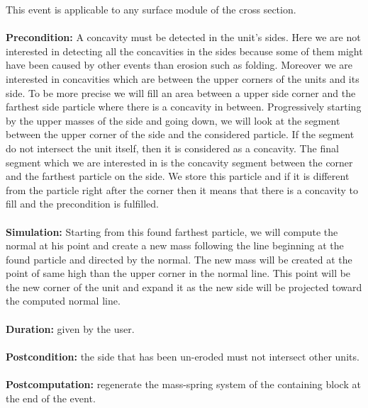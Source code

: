 \documentclass[12pt, a4paper]{report} %
\begin{document}
This event is applicable to any surface module of the cross section.\\\\
\textbf{Precondition:} A concavity must be detected in the unit's sides. Here we are not interested in detecting all the concavities in the sides because some of them might have been caused by other events than erosion such as folding. Moreover we are interested in concavities which are between the upper corners of the units and its side. To be more precise we will fill an area between a upper side corner and the farthest side particle where there is a concavity in between. Progressively starting by the upper masses of the side and going down, we will look at the segment between the upper corner of the side and the considered particle. If the segment do not intersect the unit itself, then it is considered as a concavity. The final segment which we are interested in is the concavity segment between the corner and the farthest particle on the side. We store this particle and if it is different from the particle right after the corner then it means that there is a concavity to fill and the precondition is fulfilled.\\\\
\textbf{Simulation:}  Starting from this found farthest particle, we will compute the normal at his point and create a new mass following the line beginning at the found particle and directed by the normal. The new mass will be created at the point of same high than the upper corner in the normal line. This point will be the new corner of the unit and expand it as the new side will be projected toward the computed normal line.\\\\
\textbf{Duration:} given by the user.\\\\
\textbf{Postcondition:} the side that has been un-eroded must not intersect other units.\\\\
\textbf{Postcomputation:} regenerate the mass-spring system of the containing block at the end of the event.\\\\
\end{document}
